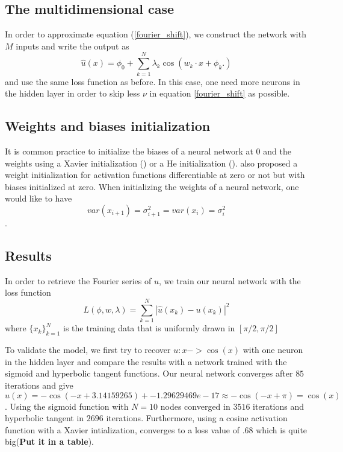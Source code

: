 \documentclass[11pt]{article}
\begin{document}
 

\subsection{The multidimensional case}
In order to approximate equation (\ref{fourier_shift}), we construct the network with $M$ inputs and write the output as
$$ \hat{u}(x) = \phi_0 + \sum_{k = 1}^N \lambda_k \cos\left( w_k\cdot x + \phi_k. \right)$$
and use the same loss function as before. In this case, one need more neurons in the hidden layer in order to skip less $\nu$ in equation \ref{fourier_shift} as possible. 
\subsection{Weights and biases initialization}
It is common practice to initialize the biases of a neural network at $0$ and the weights using a Xavier initialization (\cite{xaviergorot}) or a He initialization (\cite{heinit}). \cite{Kumar} also proposed a weight initialization for activation functions differentiable at zero or not but with biases initialized at zero. When initializing the weights of a neural network, one would like to have $$var(x_{i+1}) = \sigma_{i+1}^2 = var(x_{i}) = \sigma_{i}^2$$.




 \subsection{Results}
 In order to retrieve the Fourier series of $u$, we train our neural network with the loss function
 \begin{equation}\label{loss}
    L(\phi, w, \lambda) = \sum_{k = 1}^N |\hat{u}(x_k) - u(x_k)|^2
 \end{equation}
where $\{x_k\}_{k=1}^{N}$ is the training data that is uniformly drawn in $[\pi/2, \pi/2]$

To validate the model, we first try to recover $u: x -> \cos(x)$ with one neuron in the hidden layer and compare the results with a network trained with the sigmoid and hyperbolic tangent functions. 
Our neural network converges after $85$ iterations and give $$\hat{u}(x) = -\cos(-x + 3.14159265 ) + -1.29629469e-17 \approx -\cos(-x + \pi) = \cos(x) $$.
Using the sigmoid function with $N = 10$ nodes converged in $3516$ iterations and hyperbolic tangent in $2696$ iterations. Furthermore, using a cosine activation function with a Xavier intialization, converges to a loss value of $.68$ which is quite big(\textbf{Put it in a table}).
\end{document}

